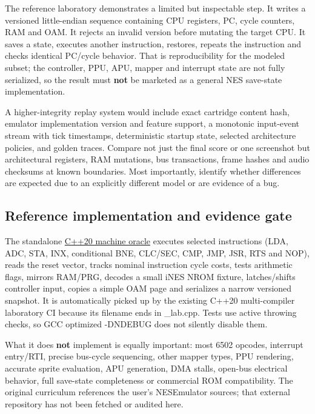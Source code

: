 The reference laboratory demonstrates a limited but inspectable step. It writes a versioned little-endian sequence containing CPU registers, PC, cycle counters, RAM and OAM. It rejects an invalid version before mutating the target CPU. It saves a state, executes another instruction, restores, repeats the instruction and checks identical PC/cycle behavior. That is reproducibility for the modeled subset; the controller, PPU, APU, mapper and interrupt state are not fully serialized, so the result must \textbf{not} be marketed as a general NES save-state implementation.

A higher-integrity replay system would include exact cartridge content hash, emulator implementation version and feature support, a monotonic input-event stream with tick timestamps, deterministic startup state, selected architecture policies, and golden traces. Compare not just the final score or one screenshot but architectural registers, RAM mutations, bus transactions, frame hashes and audio checksums at known boundaries. Most importantly, identify whether differences are expected due to an explicitly different model or are evidence of a bug.

\subsection{Reference implementation and evidence gate}\label{reference-implementation-and-evidence-gate}

The standalone \href{tools/labs/phase28_emulator_core_lab.cpp}{C++20 machine oracle} executes selected instructions (LDA, ADC, STA, INX, conditional BNE, CLC/SEC, CMP, JMP, JSR, RTS and NOP), reads the reset vector, tracks nominal instruction cycle costs, tests arithmetic flags, mirrors RAM/PRG, decodes a small iNES NROM fixture, latches/shifts controller input, copies a simple OAM page and serializes a narrow versioned snapshot. It is automatically picked up by the existing C++20 multi-compiler laboratory CI because its filename ends in \_lab.cpp. Tests use active throwing checks, so GCC optimized -DNDEBUG does not silently disable them.

What it does \textbf{not} implement is equally important: most 6502 opcodes, interrupt entry/RTI, precise bus-cycle sequencing, other mapper types, PPU rendering, accurate sprite evaluation, APU generation, DMA stalls, open-bus electrical behavior, full save-state completeness or commercial ROM compatibility. The original curriculum references the user's NESEmulator sources; that external repository has not been fetched or audited here.

